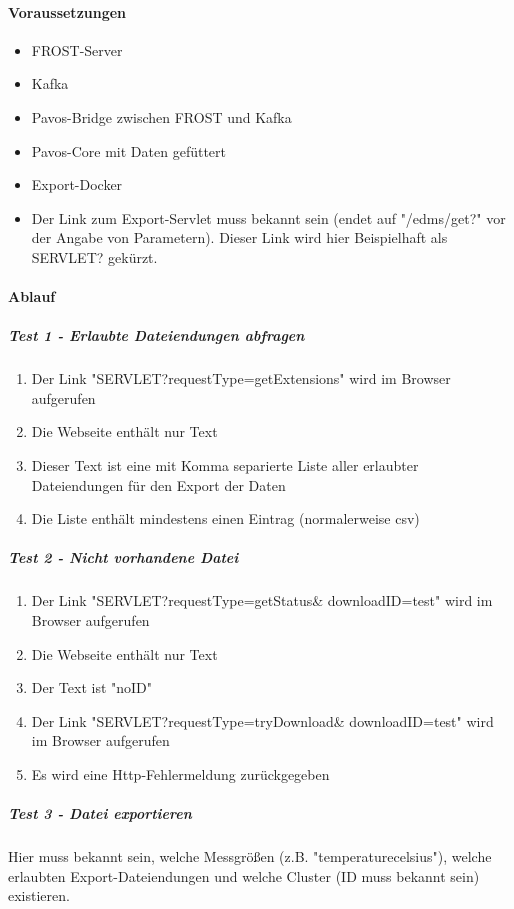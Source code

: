 \paragraph{Voraussetzungen}
\begin{itemize}
\item FROST-Server
\item Kafka
\item Pavos-Bridge zwischen FROST und Kafka
\item Pavos-Core mit Daten gefüttert
\item Export-Docker
\item Der Link zum Export-Servlet muss bekannt sein (endet auf "/edms/get?" vor der Angabe von Parametern). Dieser Link wird hier Beispielhaft als SERVLET? gekürzt.
\end{itemize}
\paragraph{Ablauf}
\subparagraph{Test 1 - Erlaubte Dateiendungen abfragen}
\begin{enumerate}
\item Der Link "SERVLET?requestType=getExtensions" wird im Browser aufgerufen
\item Die Webseite enthält nur Text
\item Dieser Text ist eine mit Komma separierte Liste aller erlaubter Dateiendungen für den Export der Daten
\item Die Liste enthält mindestens einen Eintrag (normalerweise csv)
\end{enumerate}
\subparagraph{Test 2 - Nicht vorhandene Datei}
\begin{enumerate}
\item Der Link "SERVLET?requestType=getStatus\& downloadID=test" wird im Browser aufgerufen
\item Die Webseite enthält nur Text
\item Der Text ist "noID"
\item Der Link "SERVLET?requestType=tryDownload\& downloadID=test" wird im Browser aufgerufen
\item Es wird eine Http-Fehlermeldung zurückgegeben
\end{enumerate}
\subparagraph{Test 3 - Datei exportieren}
Hier muss bekannt sein, welche Messgrößen (z.B. "temperature\textunderscore celsius"), welche erlaubten Export-Dateiendungen und welche Cluster (ID muss bekannt sein) existieren.
